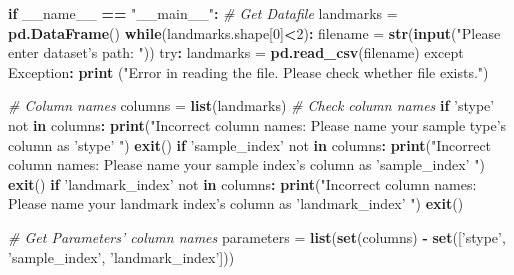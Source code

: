 \documentclass[10pt,letterpaper]{article}
\newenvironment{Shaded}{\begin{snugshade}}{\end{snugshade}}
\newcommand{\KeywordTok}[1]{\textcolor[rgb]{0.13,0.29,0.53}{\textbf{#1}}}
\newcommand{\DecValTok}[1]{\textcolor[rgb]{0.00,0.00,0.81}{#1}}
\newcommand{\StringTok}[1]{\textcolor[rgb]{0.31,0.60,0.02}{#1}}
\newcommand{\CommentTok}[1]{\textcolor[rgb]{0.56,0.35,0.01}{\textit{#1}}}
\newcommand{\ControlFlowTok}[1]{\textcolor[rgb]{0.13,0.29,0.53}{\textbf{#1}}}
\newcommand{\OperatorTok}[1]{\textcolor[rgb]{0.81,0.36,0.00}{\textbf{#1}}}
\newcommand{\NormalTok}[1]{#1}
\begin{document}
\begin{Shaded}
\begin{Highlighting}[]
\ControlFlowTok{if}\NormalTok{ __name__ }\OperatorTok{==}\StringTok{ "__main__"}\OperatorTok{:}
\StringTok{    }\CommentTok{# Get Datafile}
\StringTok{    }\NormalTok{landmarks =}\StringTok{ }\KeywordTok{pd.DataFrame}\NormalTok{()}
    \ControlFlowTok{while}\NormalTok{(landmarks.shape[}\DecValTok{0}\NormalTok{]}\OperatorTok{<}\DecValTok{2}\NormalTok{)}\OperatorTok{:}
\StringTok{        }\NormalTok{filename =}\StringTok{ }\KeywordTok{str}\NormalTok{(}\KeywordTok{input}\NormalTok{(}\StringTok{"Please enter dataset's path: "}\NormalTok{))}
\NormalTok{        try}\OperatorTok{:}
\StringTok{            }\NormalTok{landmarks =}\StringTok{ }\KeywordTok{pd.read_csv}\NormalTok{(filename)}
\NormalTok{        except Exception}\OperatorTok{:}
\StringTok{            }\KeywordTok{print}\NormalTok{ (}\StringTok{"Error in reading the file.}
\StringTok{                Please check whether file exists."}\NormalTok{)}

    \CommentTok{# Column names}
\NormalTok{    columns =}\StringTok{ }\KeywordTok{list}\NormalTok{(landmarks)}
    \CommentTok{# Check column names}
    \ControlFlowTok{if} \StringTok{'stype'}\NormalTok{ not }\ControlFlowTok{in}\NormalTok{ columns}\OperatorTok{:}
\StringTok{        }\KeywordTok{print}\NormalTok{(}\StringTok{"Incorrect column names: Please}
\StringTok{            name your sample type's column as 'stype' "}\NormalTok{)}
        \KeywordTok{exit}\NormalTok{()}
    \ControlFlowTok{if} \StringTok{'sample_index'}\NormalTok{ not }\ControlFlowTok{in}\NormalTok{ columns}\OperatorTok{:}
\StringTok{        }\KeywordTok{print}\NormalTok{(}\StringTok{"Incorrect column names: Please name your}
\StringTok{            sample index's column as 'sample_index' "}\NormalTok{)}
        \KeywordTok{exit}\NormalTok{()}
    \ControlFlowTok{if} \StringTok{'landmark_index'}\NormalTok{ not }\ControlFlowTok{in}\NormalTok{ columns}\OperatorTok{:}
\StringTok{        }\KeywordTok{print}\NormalTok{(}\StringTok{"Incorrect column names: Please name your}
\StringTok{            landmark index's column as 'landmark_index' "}\NormalTok{)}
        \KeywordTok{exit}\NormalTok{()}

    \CommentTok{# Get Parameters' column names}
\NormalTok{    parameters =}\StringTok{ }\KeywordTok{list}\NormalTok{(}\KeywordTok{set}\NormalTok{(columns) }\OperatorTok{-}
\StringTok{        }\KeywordTok{set}\NormalTok{([}\StringTok{'stype'}\NormalTok{, }\StringTok{'sample_index'}\NormalTok{, }\StringTok{'landmark_index'}\NormalTok{]))}


\end{Highlighting}
\end{Shaded}
\end{document}
